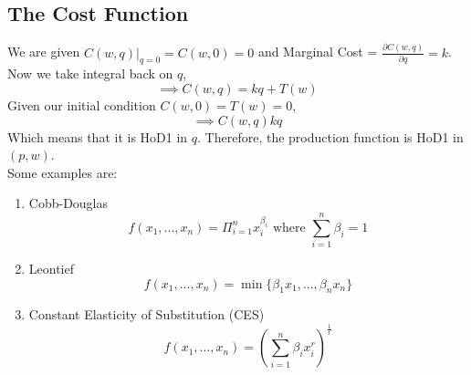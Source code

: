 \documentclass{article}
\begin{document}
\subsection*{The Cost Function}
We are given $C(w,q)|_{q=0} = C(w,0)=0$ and Marginal Cost = $\frac{\partial C(w,q)}{\partial q} =k$.\\
Now we take integral back on $q$,
\[\implies C(w,q) = kq + T(w)\]
Given our initial condition $C(w,0) = T(w) = 0$,
\[\implies C(w,q) kq\]
Which means that it is HoD1 in $q$. Therefore, the production function is HoD1 in $(p,w)$.\\
Some examples are:
\begin{enumerate}
    \item Cobb-Douglas
    \[f(x_1,...,x_n) = \Pi_{i=1}^nx_i^{\beta_i} \text{ where } \sum_{i=1}^n \beta_i = 1\]
    \item Leontief
    \[f(x_1,...,x_n) = \min\{\beta_1 x_1,...,\beta_n x_n\}\]
    \item Constant Elasticity of Substitution (CES)
    \[f(x_1,...,x_n) = (\sum_{i=1}^n \beta_i x_i^r)^{\frac{1}{r}}\]
\end{enumerate}
\end{document}
